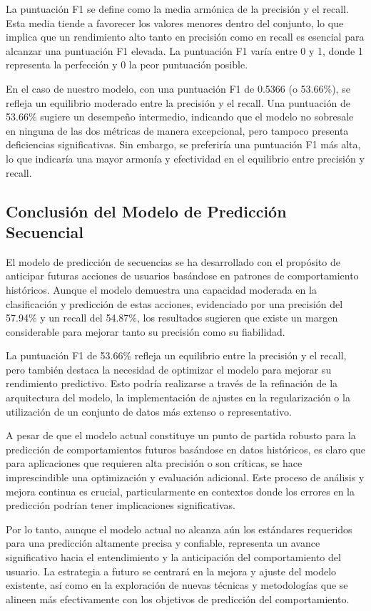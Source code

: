La puntuación F1 se define como la media armónica de la precisión y el recall. Esta media tiende a favorecer los valores menores dentro del conjunto, lo que implica que un rendimiento alto tanto en precisión como en recall es esencial para alcanzar una puntuación F1 elevada. La puntuación F1 varía entre 0 y 1, donde 1 representa la perfección y 0 la peor puntuación posible.

En el caso de nuestro modelo, con una puntuación F1 de 0.5366 (o 53.66\%), se refleja un equilibrio moderado entre la precisión y el recall. Una puntuación de 53.66\% sugiere un desempeño intermedio, indicando que el modelo no sobresale en ninguna de las dos métricas de manera excepcional, pero tampoco presenta deficiencias significativas. Sin embargo, se preferiría una puntuación F1 más alta, lo que indicaría una mayor armonía y efectividad en el equilibrio entre precisión y recall.

\subsection{Conclusión del Modelo de Predicción Secuencial}

El modelo de predicción de secuencias se ha desarrollado con el propósito de anticipar futuras acciones de usuarios basándose en patrones de comportamiento históricos. Aunque el modelo demuestra una capacidad moderada en la clasificación y predicción de estas acciones, evidenciado por una precisión del 57.94\% y un recall del 54.87\%, los resultados sugieren que existe un margen considerable para mejorar tanto su precisión como su fiabilidad.

La puntuación F1 de 53.66\% refleja un equilibrio entre la precisión y el recall, pero también destaca la necesidad de optimizar el modelo para mejorar su rendimiento predictivo. Esto podría realizarse a través de la refinación de la arquitectura del modelo, la implementación de ajustes en la regularización o la utilización de un conjunto de datos más extenso o representativo.

A pesar de que el modelo actual constituye un punto de partida robusto para la predicción de comportamientos futuros basándose en datos históricos, es claro que para aplicaciones que requieren alta precisión o son críticas, se hace imprescindible una optimización y evaluación adicional. Este proceso de análisis y mejora continua es crucial, particularmente en contextos donde los errores en la predicción podrían tener implicaciones significativas.

Por lo tanto, aunque el modelo actual no alcanza aún los estándares requeridos para una predicción altamente precisa y confiable, representa un avance significativo hacia el entendimiento y la anticipación del comportamiento del usuario. La estrategia a futuro se centrará en la mejora y ajuste del modelo existente, así como en la exploración de nuevas técnicas y metodologías que se alineen más efectivamente con los objetivos de predicción del comportamiento.